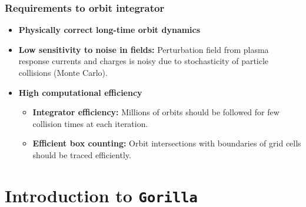 \documentclass{beamer}
\begin{document}
\begin{frame}
\frametitle{Requirements to orbit integrator}
\vspace{-0.5cm}
\begin{itemize}
\item \textbf{Physically correct long-time orbit dynamics}
\item \textbf{Low sensitivity to noise in fields:} Perturbation field from plasma response currents and charges is noisy due to stochasticity of particle collisions (Monte Carlo).
\item \textbf{High computational efficiency}
\begin{itemize}
\item \textbf{Integrator efficiency:} Millions of orbits should be followed for few collision times at each iteration.
\item \textbf{Efficient box counting:} Orbit intersections with boundaries of grid cells should be traced efficiently.
\end{itemize}
\end{itemize}
\end{frame}


\section{Introduction to \texttt{Gorilla}}

%		
\end{document}
